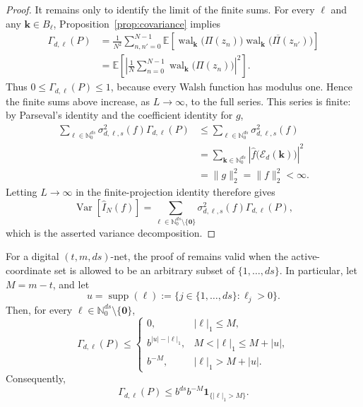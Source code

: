 \documentclass[11pt]{article}
\newcommand{\Nzero}{\mathbb N_0}
\newcommand{\E}{\mathcal E}
\newcommand{\wal}{\operatorname{wal}}
\newcommand{\supp}{\operatorname{supp}}
\newcommand{\Var}{\operatorname{Var}}
\newcommand{\one}{\mathbf 1}
\newcommand{\abs}[1]{\lvert #1\rvert}
\begin{document}
\begin{proof}
It remains only to identify the limit of the finite sums.  For every
\(\boldsymbol\ell\) and any
\(\boldsymbol k\in B_{\boldsymbol\ell}\),
Proposition~\ref{prop:covariance} implies
\[
\begin{aligned}
  \Gamma_{d,\boldsymbol\ell}(P)
  &=\frac1{N^2}\sum_{n,n'=0}^{N-1}
    \mathbb E\!\left[
      \wal_{\boldsymbol k}\bigl(\Pi(z_n)\bigr)
      \overline{
        \wal_{\boldsymbol k}\bigl(\Pi(z_{n'})\bigr)
      }
    \right] \\
  &=\mathbb E\!\left[
      \left|
        \frac1N\sum_{n=0}^{N-1}
          \wal_{\boldsymbol k}\bigl(\Pi(z_n)\bigr)
      \right|^2
    \right].
\end{aligned}
\]
Thus
\(0\leq\Gamma_{d,\boldsymbol\ell}(P)\leq1\),
because every Walsh function has modulus one.  Hence the finite sums above
increase, as \(L\to\infty\), to the full series.  This series is finite:
by Parseval's identity and the coefficient identity for \(g\),
\[
\begin{aligned}
  \sum_{\boldsymbol\ell\in\Nzero^{ds}}
    \sigma_{d,\boldsymbol\ell,s}^2(f)
    \Gamma_{d,\boldsymbol\ell}(P)
  &\leq
  \sum_{\boldsymbol\ell\in\Nzero^{ds}}
    \sigma_{d,\boldsymbol\ell,s}^2(f) \\
  &=\sum_{\boldsymbol k\in\Nzero^{ds}}
      \left|
        \widehat f\bigl(\E_d(\boldsymbol k)\bigr)
      \right|^2 \\
  &=\lVert g\rVert_2^2
   =\lVert f\rVert_2^2
   <\infty.
\end{aligned}
\]
Letting \(L\to\infty\) in the finite-projection identity therefore gives
\[
  \Var[\widehat I_N(f)]
  =\sum_{\boldsymbol\ell\in
       \Nzero^{ds}\setminus\{\boldsymbol0\}}
     \sigma_{d,\boldsymbol\ell,s}^2(f)
     \Gamma_{d,\boldsymbol\ell}(P),
\]
which is the asserted variance decomposition.
\end{proof}

For a digital \((t,m,ds)\)-net, the proof of \cite[Lemma~8]{Dick2011} remains valid when the active-coordinate set is allowed to be an arbitrary subset of \(\{1,\ldots,ds\}\). In particular, let \(M=m-t\), and let
\[
u=\supp(\boldsymbol\ell)
  :=\{j\in\{1,\ldots,ds\}:\ell_j>0\}.
\]
Then, for every
\(\boldsymbol\ell\in\Nzero^{ds}\setminus\{\boldsymbol0\}\),
\begin{equation}\label{eq:gain-piecewise}
 \Gamma_{d,\boldsymbol\ell}(P)\le
 \begin{cases}
  0,
     &\abs{\boldsymbol\ell}_1\le M,\\
  b^{\abs u-\abs{\boldsymbol\ell}_1},
     &M<\abs{\boldsymbol\ell}_1\le M+\abs u,\\
  b^{-M},
     &\abs{\boldsymbol\ell}_1>M+\abs u.
 \end{cases}
\end{equation}
Consequently,
\begin{equation}\label{eq:gain-uniform}
 \Gamma_{d,\boldsymbol\ell}(P)
 \le b^{ds}b^{-M}
       \one_{\{\abs{\boldsymbol\ell}_1>M\}}.
\end{equation}
\end{document}
